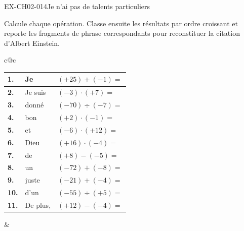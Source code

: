 
\begin{exercice}{EX-CH02-014}{Je n'ai pas de talents particuliers}

Calcule chaque opération. Classe ensuite les résultats par ordre croissant et reporte les fragments de phrase correspondants pour reconstituer la citation
d'Albert Einstein.

\def\arraystretch{1.25}
\setlength{\tabcolsep}{4pt}
\vspace{2mm}

\begin{center}
\begin{tabular}{c@{\hspace{8mm}}c}

  \begin{tabular}{|>{\centering\arraybackslash}p{6mm}|p{3.5cm}|p{3cm}|}
    \hline
    \cellcolor{gray!40}\textbf{1.}  &Je& $(+25)+(-1)=$               \\ \hline
    \cellcolor{gray!40}\textbf{2.}  &Je suis& $(-3)\cdot(+7)=$              \\ \hline
    \cellcolor{gray!40}\textbf{3.}  &donné& $(-70)\div(-7)=$              \\ \hline
    \cellcolor{gray!40}\textbf{4.}  &bon& $(+2)\cdot(-1)=$               \\ \hline
    \cellcolor{gray!40}\textbf{5.}  &et& $(-6)\cdot(+12)=$             \\ \hline
    \cellcolor{gray!40}\textbf{6.}  &Dieu& $(+16)\cdot(-4)=$             \\ \hline
    \cellcolor{gray!40}\textbf{7.}  &de& $(+8)-(-5)=$        \\ \hline
    \cellcolor{gray!40}\textbf{8.}  &un& $(-72)+(-8)=$                 \\ \hline
    \cellcolor{gray!40}\textbf{9.}  &juste& $(-21)+(-4)=$                 \\ \hline
    \cellcolor{gray!40}\textbf{10.} &d'un& $(-55)\div(+5)=$              \\ \hline
    \cellcolor{gray!40}\textbf{11.} &De plus,& $(+12)-(-4)=$      \\ \hline
  \end{tabular}

  &


\end{tabular}
\end{center}
\end{exercice}
